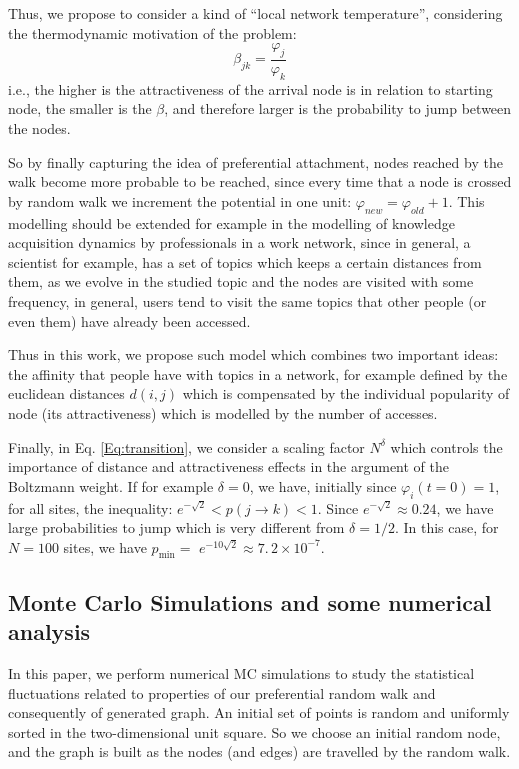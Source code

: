 \documentclass[3p, 11pt]{elsarticle}
\begin{document}
Thus, we propose to consider a kind of \textquotedblleft local network
temperature\textquotedblright , considering the thermodynamic motivation of
the problem: 
\begin{equation}
\beta _{jk}=\frac{\varphi _{j}}{\varphi _{k}}  \label{Eq:beta}
\end{equation}%
i.e., the higher is the attractiveness of the arrival node is in relation to
starting node, the smaller is the $\beta $, and therefore larger is the
probability to jump between the nodes.

So by finally capturing the idea of preferential attachment, nodes reached
by the walk become more probable to be reached, since every time that a node
is crossed by random walk we increment the potential in one unit: $\varphi
_{new}=\varphi _{old}+1$. This modelling should be extended for example in
the modelling of knowledge acquisition dynamics by professionals in a work
network, since in general, a scientist for example, has a set of topics
which keeps a certain distances from them, as we evolve in the studied topic
and the nodes are visited with some frequency, in general, users tend to
visit the same topics that other people (or even them) have already been
accessed.

Thus in this work, we propose such model which combines two important ideas:
the affinity that people have with topics in a network, for example defined
by the euclidean distances $d(i,j)$ which is compensated by the individual
popularity of node (its attractiveness) which is modelled by the number of
accesses.

Finally, in Eq. \ref{Eq:transition}, we consider a scaling factor $N^{\delta
}$ which controls the importance of distance and attractiveness effects in
the argument of the Boltzmann weight. If for example $\delta =0$, we have,
initially since $\varphi _{i}(t=0)=1$, for all sites, the inequality: $e^{-%
\sqrt{2}}<p(j\rightarrow k)<1$. Since $e^{-\sqrt{2}}\approx 0.24$, we have
large probabilities to jump which is very different from $\delta =1/2$. In
this case, for $N=100$ sites, we have $p_{\min }=$ $e^{-10\sqrt{2}}\approx
7.\,\allowbreak 2\times 10^{-7}$.

\subsection{Monte Carlo Simulations and some numerical analysis}

\label{Sec:Monte_Carlo_Simulations}

In this paper, we perform numerical MC simulations to study the statistical
fluctuations related to properties of our preferential random walk and
consequently of generated graph. An initial set of points is random and
uniformly sorted in the two-dimensional unit square. So we choose an initial
random node, and the graph is built as the nodes (and edges) are travelled
by the random walk.
\end{document}
